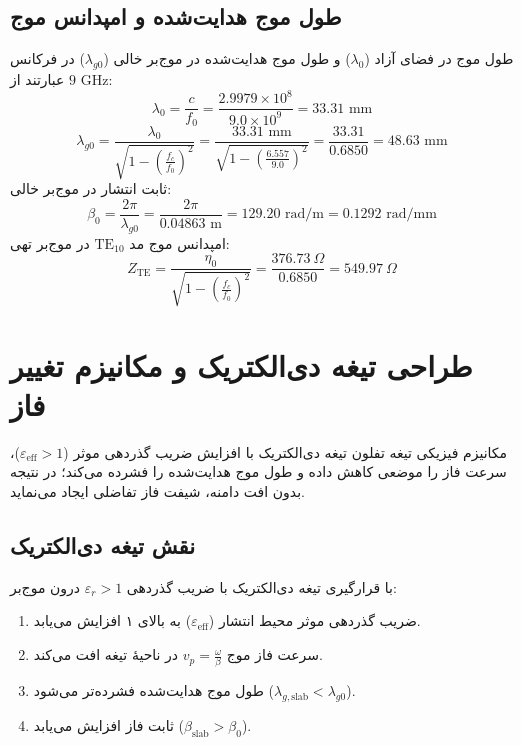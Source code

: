 \documentclass[11pt,a4paper]{article}
\begin{document}
\subsection{طول موج هدایت‌شده و امپدانس موج}
طول موج در فضای آزاد ($\lambda_0$) و طول موج هدایت‌شده در موج‌بر خالی ($\lambda_{g0}$) در فرکانس $9\text{ GHz}$ عبارتند از:
\begin{equation}
\lambda_0 = \frac{c}{f_0} = \frac{2.9979 \times 10^8}{9.0 \times 10^9} = 33.31\text{ mm}
\end{equation}
\begin{equation}
\lambda_{g0} = \frac{\lambda_0}{\sqrt{1 - \left(\frac{f_c}{f_0}\right)^2}} = \frac{33.31\text{ mm}}{\sqrt{1 - \left(\frac{6.557}{9.0}\right)^2}} = \frac{33.31}{0.6850} = 48.63\text{ mm}
\end{equation}
ثابت انتشار در موج‌بر خالی:
\begin{equation}
\beta_0 = \frac{2\pi}{\lambda_{g0}} = \frac{2\pi}{0.04863\text{ m}} = 129.20\text{ rad/m} = 0.1292\text{ rad/mm}
\end{equation}
امپدانس موج مد $\text{TE}_{10}$ در موج‌بر تهی:
\begin{equation}
Z_{\text{TE}} = \frac{\eta_0}{\sqrt{1 - \left(\frac{f_c}{f_0}\right)^2}} = \frac{376.73\ \Omega}{0.6850} = 549.97\ \Omega
\end{equation}

\section{طراحی تیغه دی‌الکتریک و مکانیزم تغییر فاز}

\begin{phboxb}{مکانیزم فیزیکی تیغه تفلون}
تیغه دی‌الکتریک با افزایش ضریب گذردهی موثر ($\varepsilon_{\text{eff}} > 1$)، سرعت فاز را موضعی کاهش داده و طول موج هدایت‌شده را فشرده می‌کند؛ در نتیجه بدون افت دامنه، شیفت فاز تفاضلی ایجاد می‌نماید.
\end{phboxb}

\subsection{نقش تیغه دی‌الکتریک }
با قرارگیری تیغه دی‌الکتریک با ضریب گذردهی $\varepsilon_r > 1$ درون موج‌بر:
\begin{enumerate}
    \item ضریب گذردهی موثر محیط انتشار ($\varepsilon_{\text{eff}}$) به بالای ۱ افزایش می‌یابد.
    \item سرعت فاز موج $v_p = \frac{\omega}{\beta}$ در ناحیهٔ تیغه افت می‌کند.
    \item طول موج هدایت‌شده فشرده‌تر می‌شود ($\lambda_{g,\text{slab}} < \lambda_{g0}$).
    \item ثابت فاز افزایش می‌یابد ($\beta_{\text{slab}} > \beta_0$).
\end{enumerate}
\end{document}
